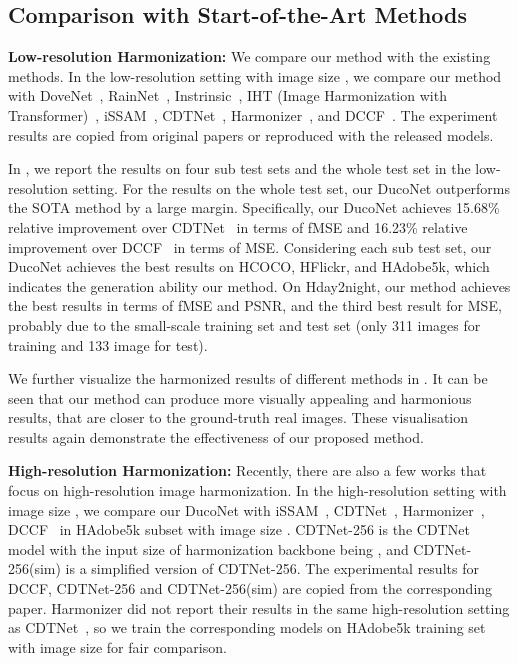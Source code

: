 \documentclass[sigconf]{acmart}
\begin{document}
\subsection{Comparison with Start-of-the-Art Methods}
\noindent\textbf{Low-resolution Harmonization: } We compare our method with the existing methods. 
In the low-resolution setting with image size , we compare our method with DoveNet~\cite{dovenet}, RainNet~\cite{rainnet}, Instrinsic~\cite{intrinsic}, IHT (Image Harmonization with Transformer)~\cite{IHT}, iSSAM~\cite{issam}, CDTNet~\cite{CDTNet}, Harmonizer~\cite{harmonizer}, and DCCF~\cite{DCCF}. The experiment results are copied from original papers or reproduced with the released models.

In , we report the results on four sub test sets and the whole test set in the low-resolution setting.
For the results on the whole test set, our DucoNet outperforms the SOTA method by a large margin.
Specifically, our DucoNet achieves 15.68\% relative improvement over CDTNet~\cite{CDTNet} in terms of fMSE and 16.23\% relative improvement over DCCF~\cite{DCCF} in terms of MSE. 
Considering each sub test set, our DucoNet achieves the best results on HCOCO, HFlickr, and HAdobe5k, which indicates the generation ability our method.
On Hday2night, our method achieves the best results in terms of fMSE and PSNR, and the third best result for MSE, probably due to the small-scale training set and test set (only 311 images for training and 133 image for test). 

We further visualize the harmonized results of different methods in .
It can be seen that our method can produce more visually appealing and harmonious results, that are closer to the ground-truth real images. These visualisation results again demonstrate the effectiveness of our proposed method. 

\noindent\textbf{High-resolution Harmonization: } 
Recently, there are also a few works that focus on high-resolution image harmonization.
In the high-resolution setting with image size , we compare our  DucoNet with iSSAM~\cite{issam}, CDTNet~\cite{CDTNet}, Harmonizer~\cite{harmonizer}, DCCF~\cite{DCCF} in HAdobe5k subset with image size . 
CDTNet-256 is the CDTNet~\cite{CDTNet} model with the input size of harmonization backbone being , and CDTNet-256(sim) is a simplified version of CDTNet-256. 
The experimental results for DCCF, CDTNet-256 and CDTNet-256(sim) are copied from the corresponding paper. 
Harmonizer did not report their results in the same high-resolution setting as CDTNet~\cite{CDTNet}, so we train the corresponding models on HAdobe5k training set with image size  for fair comparison. 
\end{document}
